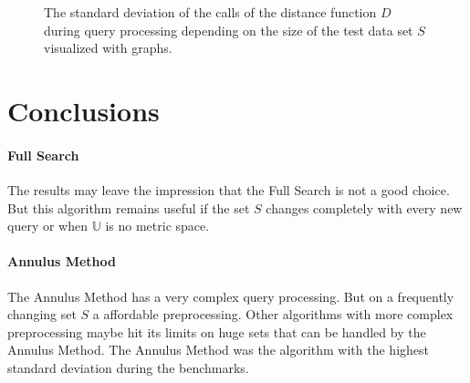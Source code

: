 \documentclass[runningheads,a4paper]{llncs}
\begin{document}
\begin{figure}
	\begin{center}
	\end{center}
	\caption{The standard deviation of the calls of the distance function $D$ during query processing depending on the
		size of the test data set $S$ visualized with graphs.}
	\label{fig:standarddeviation:graph}
\end{figure}

\section{Conclusions}

\paragraph{Full Search} The results may leave the impression that the Full Search is not a good choice. But this
algorithm remains useful if the set $S$ changes completely with every new query or when $\mathbb{U}$ is no metric space.

\paragraph{Annulus Method} The Annulus Method has a very complex query processing. But on a frequently changing set $S$
a affordable preprocessing. Other algorithms with more complex preprocessing maybe hit its limits on huge sets that
can be handled by the Annulus Method. The Annulus Method was the algorithm with the highest standard deviation during
the benchmarks.
\end{document}
